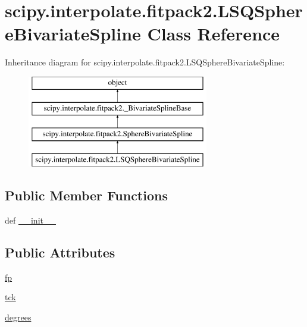 \hypertarget{classscipy_1_1interpolate_1_1fitpack2_1_1LSQSphereBivariateSpline}{}\section{scipy.\+interpolate.\+fitpack2.\+L\+S\+Q\+Sphere\+Bivariate\+Spline Class Reference}
\label{classscipy_1_1interpolate_1_1fitpack2_1_1LSQSphereBivariateSpline}
Inheritance diagram for scipy.\+interpolate.\+fitpack2.\+L\+S\+Q\+Sphere\+Bivariate\+Spline\+:\begin{figure}[H]
\begin{center}
\leavevmode
\includegraphics[height=4.000000cm]{classscipy_1_1interpolate_1_1fitpack2_1_1LSQSphereBivariateSpline}
\end{center}
\end{figure}
\subsection*{Public Member Functions}
\begin{DoxyCompactItemize}
\item 
def \hyperlink{classscipy_1_1interpolate_1_1fitpack2_1_1LSQSphereBivariateSpline_a9ffd1180eaebd276f7ed5cb03fc8bd82}{\+\_\+\+\_\+init\+\_\+\+\_\+}
\end{DoxyCompactItemize}
\subsection*{Public Attributes}
\begin{DoxyCompactItemize}
\item 
\hyperlink{classscipy_1_1interpolate_1_1fitpack2_1_1LSQSphereBivariateSpline_ab325f0a49593c7b952421bec8a4eb44e}{fp}
\item 
\hyperlink{classscipy_1_1interpolate_1_1fitpack2_1_1LSQSphereBivariateSpline_aac91f689a74f0fa821845a4dbd0202df}{tck}
\item 
\hyperlink{classscipy_1_1interpolate_1_1fitpack2_1_1LSQSphereBivariateSpline_a274bf24b5a51c49d199c59579ac0a191}{degrees}
\end{DoxyCompactItemize}


